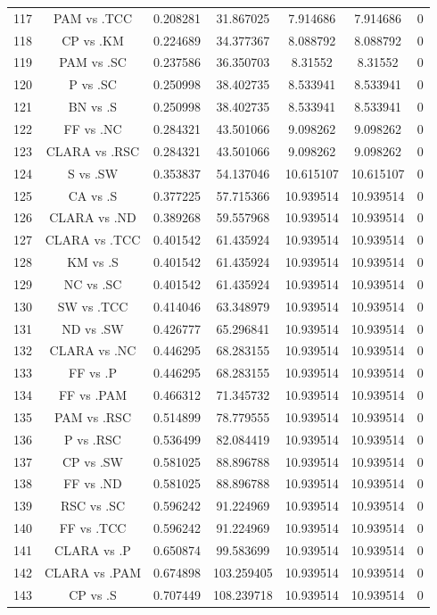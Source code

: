 \documentclass[a4paper,10pt]{article}
\begin{document}
\begin{landscape}
\begin{table}[!htp]
\begin{tabular}{ccccccc}
117&PAM vs .TCC&0.208281&31.867025&7.914686&7.914686&0\\
118&CP vs .KM&0.224689&34.377367&8.088792&8.088792&0\\
119&PAM vs .SC&0.237586&36.350703&8.31552&8.31552&0\\
120&P vs .SC&0.250998&38.402735&8.533941&8.533941&0\\
121&BN vs .S&0.250998&38.402735&8.533941&8.533941&0\\
122&FF vs .NC&0.284321&43.501066&9.098262&9.098262&0\\
123&CLARA vs .RSC&0.284321&43.501066&9.098262&9.098262&0\\
124&S vs .SW&0.353837&54.137046&10.615107&10.615107&0\\
125&CA vs .S&0.377225&57.715366&10.939514&10.939514&0\\
126&CLARA vs .ND&0.389268&59.557968&10.939514&10.939514&0\\
127&CLARA vs .TCC&0.401542&61.435924&10.939514&10.939514&0\\
128&KM vs .S&0.401542&61.435924&10.939514&10.939514&0\\
129&NC vs .SC&0.401542&61.435924&10.939514&10.939514&0\\
130&SW vs .TCC&0.414046&63.348979&10.939514&10.939514&0\\
131&ND vs .SW&0.426777&65.296841&10.939514&10.939514&0\\
132&CLARA vs .NC&0.446295&68.283155&10.939514&10.939514&0\\
133&FF vs .P&0.446295&68.283155&10.939514&10.939514&0\\
134&FF vs .PAM&0.466312&71.345732&10.939514&10.939514&0\\
135&PAM vs .RSC&0.514899&78.779555&10.939514&10.939514&0\\
136&P vs .RSC&0.536499&82.084419&10.939514&10.939514&0\\
137&CP vs .SW&0.581025&88.896788&10.939514&10.939514&0\\
138&FF vs .ND&0.581025&88.896788&10.939514&10.939514&0\\
139&RSC vs .SC&0.596242&91.224969&10.939514&10.939514&0\\
140&FF vs .TCC&0.596242&91.224969&10.939514&10.939514&0\\
141&CLARA vs .P&0.650874&99.583699&10.939514&10.939514&0\\
142&CLARA vs .PAM&0.674898&103.259405&10.939514&10.939514&0\\
143&CP vs .S&0.707449&108.239718&10.939514&10.939514&0\\

\end{tabular}
\end{table}
\end{landscape}
\end{document}
